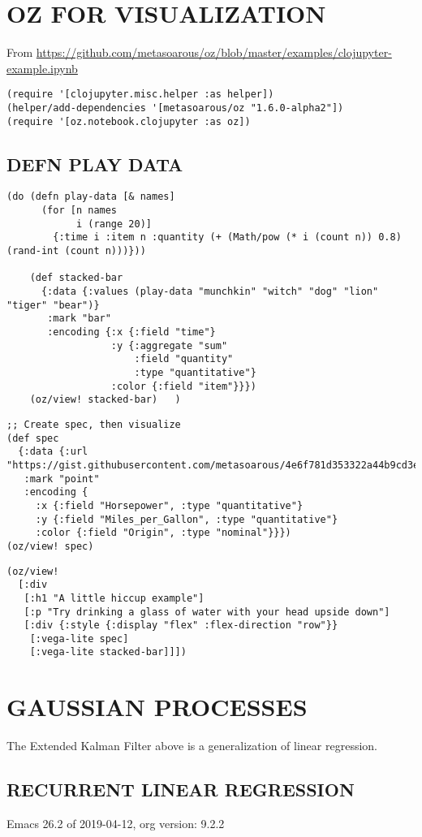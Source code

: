 \documentclass[10pt,oneside,x11names]{article}
\begin{document}
\section{OZ FOR VISUALIZATION}
\label{oz-for-visualization}
From
\url{https://github.com/metasoarous/oz/blob/master/examples/clojupyter-example.ipynb}

\begin{verbatim}
(require '[clojupyter.misc.helper :as helper])
(helper/add-dependencies '[metasoarous/oz "1.6.0-alpha2"])
(require '[oz.notebook.clojupyter :as oz])
\end{verbatim}

\subsection{DEFN PLAY DATA}
\label{sec:orgd7a9800}

\begin{verbatim}
(do (defn play-data [& names]
      (for [n names
            i (range 20)]
        {:time i :item n :quantity (+ (Math/pow (* i (count n)) 0.8) (rand-int (count n)))}))

    (def stacked-bar
      {:data {:values (play-data "munchkin" "witch" "dog" "lion" "tiger" "bear")}
       :mark "bar"
       :encoding {:x {:field "time"}
                  :y {:aggregate "sum"
                      :field "quantity"
                      :type "quantitative"}
                  :color {:field "item"}}})
    (oz/view! stacked-bar)   )
\end{verbatim}

\begin{verbatim}
;; Create spec, then visualize
(def spec
  {:data {:url "https://gist.githubusercontent.com/metasoarous/4e6f781d353322a44b9cd3e4597c532c/raw/cd633d9bb8e0bed4a5b8e66a32b9569ca2147989/cars.json"}
   :mark "point"
   :encoding {
     :x {:field "Horsepower", :type "quantitative"}
     :y {:field "Miles_per_Gallon", :type "quantitative"}
     :color {:field "Origin", :type "nominal"}}})
(oz/view! spec)
\end{verbatim}

\begin{verbatim}
(oz/view!
  [:div
   [:h1 "A little hiccup example"]
   [:p "Try drinking a glass of water with your head upside down"]
   [:div {:style {:display "flex" :flex-direction "row"}}
    [:vega-lite spec]
    [:vega-lite stacked-bar]]])
\end{verbatim}

\section{GAUSSIAN PROCESSES}
\label{gaussian-processes}
The Extended Kalman Filter above is a generalization of linear
regression.

\subsection{RECURRENT LINEAR REGRESSION}
\label{recurrent-linear-regression}
Emacs 26.2 of 2019-04-12, org version: 9.2.2
\end{document}
